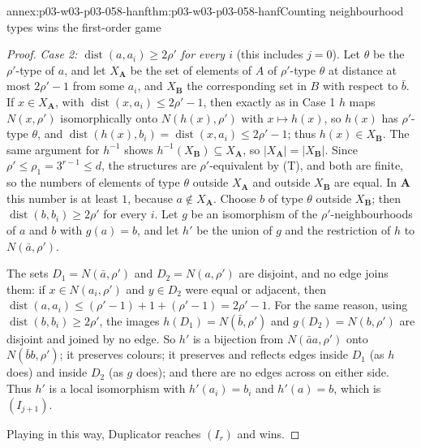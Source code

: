 \begin{annexitem}{annex:p03-w03-p03-058-hanf}{thm:p03-w03-p03-058-hanf}{Counting neighbourhood types wins the first-order game}
\begin{proof}
\emph{Case 2: \(\operatorname{dist}(a,a_i)\ge2\rho'\) for every \(i\)}
(this includes \(j=0\)). Let \(\theta\) be the \(\rho'\)-type of \(a\), and
let \(X_{\mathbf A}\) be the set of elements of \(A\) of \(\rho'\)-type
\(\theta\) at distance at most \(2\rho'-1\) from some \(a_i\), and
\(X_{\mathbf B}\) the corresponding set in \(B\) with respect to \(\bar b\).
If \(x\in X_{\mathbf A}\), with \(\operatorname{dist}(x,a_i)\le2\rho'-1\),
then exactly as in Case 1 \(h\) maps \(N(x,\rho')\) isomorphically onto
\(N(h(x),\rho')\) with \(x\mapsto h(x)\), so \(h(x)\) has \(\rho'\)-type
\(\theta\), and \(\operatorname{dist}(h(x),b_i)=\operatorname{dist}(x,a_i)
\le2\rho'-1\); thus \(h(x)\in X_{\mathbf B}\). The same argument for
\(h^{-1}\) shows \(h^{-1}(X_{\mathbf B})\subseteq X_{\mathbf A}\), so
\(|X_{\mathbf A}|=|X_{\mathbf B}|\). Since \(\rho'\le\rho_1=3^{r-1}\le d\),
the structures are \(\rho'\)-equivalent by (T), and both are finite, so the
numbers of elements of type \(\theta\) outside \(X_{\mathbf A}\) and outside
\(X_{\mathbf B}\) are equal. In \(\mathbf A\) this number is at least
\(1\), because \(a\notin X_{\mathbf A}\). Choose \(b\) of type \(\theta\)
outside \(X_{\mathbf B}\); then \(\operatorname{dist}(b,b_i)\ge2\rho'\) for
every \(i\). Let \(g\) be an isomorphism of the \(\rho'\)-neighbourhoods of
\(a\) and \(b\) with \(g(a)=b\), and let \(h'\) be the union of \(g\) and
the restriction of \(h\) to \(N(\bar a,\rho')\).

The sets \(D_1=N(\bar a,\rho')\) and \(D_2=N(a,\rho')\) are disjoint, and
no edge joins them: if \(x\in N(a_i,\rho')\) and \(y\in D_2\) were equal or
adjacent, then \(\operatorname{dist}(a,a_i)\le(\rho'-1)+1+(\rho'-1)=
2\rho'-1\). For the same reason, using \(\operatorname{dist}(b,b_i)\ge
2\rho'\), the images \(h(D_1)=N(\bar b,\rho')\) and \(g(D_2)=N(b,\rho')\)
are disjoint and joined by no edge. So \(h'\) is a bijection from
\(N(\bar aa,\rho')\) onto \(N(\bar bb,\rho')\); it preserves colours; it
preserves and reflects edges inside \(D_1\) (as \(h\) does) and inside
\(D_2\) (as \(g\) does); and there are no edges across on either side.
Thus \(h'\) is a local isomorphism with \(h'(a_i)=b_i\) and \(h'(a)=b\),
which is \((I_{j+1})\).

Playing in this way, Duplicator reaches \((I_r)\) and wins.
\end{proof}
\end{annexitem}

